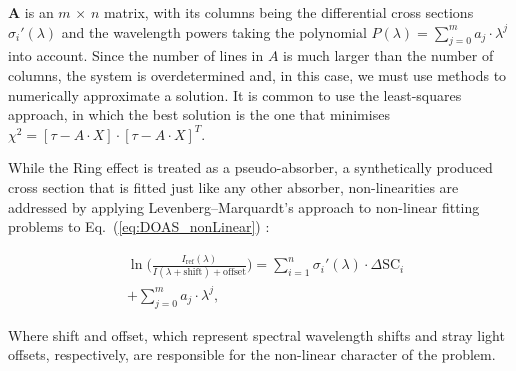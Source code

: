 $\mathbf{A}$ is an $m\,\times\,n$ matrix, with its columns being the
differential cross sections $\sigma_{i}{'}(\lambda)$ and the wavelength
powers taking the polynomial $P(\lambda) = \sum_{j = 0}^{m} a_{j} \cdot
\lambda^{j}$ into account. Since the number of lines in $A$ is much
larger than the number of columns, the system is overdetermined and, in
this case, we must use methods to numerically approximate a solution. It
is common to use the least-squares approach, in which the best solution
is the one that minimises $\chi^{2} = \left[\tau - A \cdot X\right]
\cdot \left[\tau - A \cdot X\right]^{T}$.

While the Ring effect is treated as a pseudo-absorber, a synthetically
produced~\cite{Chance1997} cross section that is fitted just like any
other absorber, non-linearities are addressed by applying
Levenberg--Marquardt's approach to non-linear fitting problems to
Eq.~(\ref{eq:DOAS_nonLinear}) \cite{Merlaud2013,Press2007}:


\begin{align}
      \label{eq:DOAS_nonLinear}
      &\ln\Big( \frac{I_\mathrm{ref}(\lambda)}{I(\lambda + \mathrm{shift}) + \mathrm{offset}} \Big) = \sum_{i = 1}^{n} \sigma_{i}{'}(\lambda) \cdot \Delta \mathrm{SC}_{i} \nonumber\\
      &+ \sum_{j = 0}^{m} a_{j} \cdot \lambda^{j},
\end{align}

Where shift and offset, which represent spectral wavelength shifts and
stray light offsets, respectively, are responsible for the non-linear
character of the problem.
